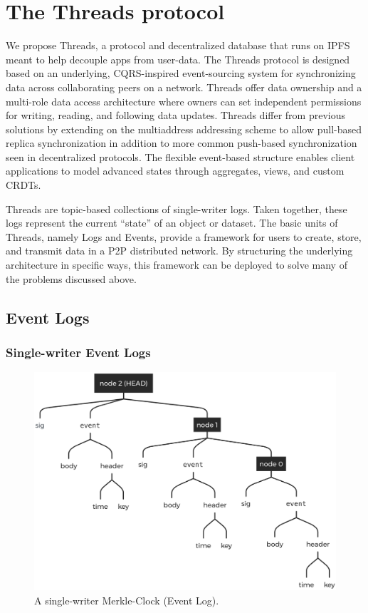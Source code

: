 \documentclass{textile}
\begin{document}
\section{The Threads protocol}\label{sec:ThreadsProtocol}

We propose Threads, a protocol and decentralized database that runs on IPFS meant to help decouple apps from user-data. The Threads protocol is designed based on an underlying, CQRS-inspired event-sourcing system for synchronizing data across collaborating peers on a network. Threads offer data ownership and a multi-role data access architecture where owners can set independent permissions for writing, reading, and following data updates. Threads differ from previous solutions by extending on the multiaddress addressing scheme to allow pull-based replica synchronization in addition to more common push-based synchronization seen in decentralized protocols. The flexible event-based structure enables client applications to model advanced states through aggregates, views, and custom CRDTs.

Threads are topic-based collections of single-writer logs. Taken together, these logs represent the current ``state'' of an object or dataset. The basic units of Threads, namely Logs and Events, provide a framework for users to create, store, and transmit data in a P2P distributed network. By structuring the underlying architecture in specific ways, this framework can be deployed to solve many of the problems discussed above.

\subsection{ Event Logs}

\subsubsection{Single-writer Event Logs}

\begin{figure}[!b]
  \includegraphics[width=\linewidth]{figures/Event_Log.png}
  \caption{A single-writer Merkle-Clock (Event Log).}
  \label{fig:EventLog}
\end{figure}
\end{document}
